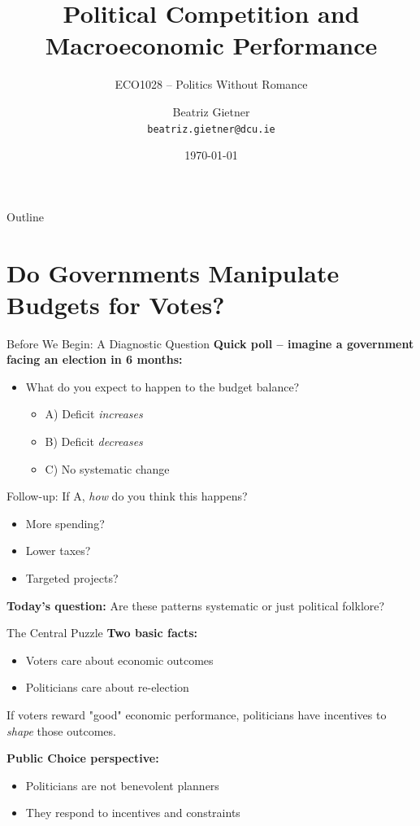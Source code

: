 \documentclass[10pt]{beamer}
\title{Political Competition and Macroeconomic Performance}
\subtitle{ECO1028 – Politics Without Romance}
\author{Beatriz Gietner\\
\texttt{beatriz.gietner@dcu.ie}}
\date{\today}
\begin{document}
\maketitle

\begin{frame}{Outline}
\tableofcontents
\end{frame}



\section{Do Governments Manipulate Budgets for Votes?}

\begin{frame}{Before We Begin: A Diagnostic Question}
\textbf{Quick poll – imagine a government facing an election in 6 months:}

\begin{itemize}
\item What do you expect to happen to the \alert{budget balance}?
\begin{itemize}
\item A) Deficit \emph{increases}
\item B) Deficit \emph{decreases}
\item C) No systematic change
\end{itemize}
\end{itemize}

\vspace{0.5cm}
\alert{Follow-up:} If A, \emph{how} do you think this happens?
\begin{itemize}
\item More spending?
\item Lower taxes?
\item Targeted projects?
\end{itemize}

\vspace{0.5cm}
\textbf{Today's question:} Are these patterns systematic or just political folklore?
\end{frame}


\begin{frame}{The Central Puzzle}
\textbf{Two basic facts:}

\begin{itemize}
\item Voters care about economic outcomes
\item Politicians care about re-election
\end{itemize}

\vspace{0.5cm}
\alert{If voters reward "good" economic performance,}
politicians have incentives to \emph{shape} those outcomes.

\vspace{0.5cm}
\textbf{Public Choice perspective:}
\begin{itemize}
\item Politicians are not benevolent planners
\item They respond to incentives and constraints
\end{itemize}
\end{frame}
\end{document}
